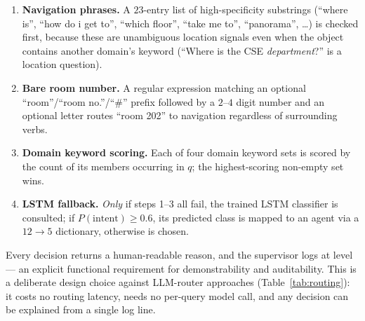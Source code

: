 \begin{enumerate}
\item \textbf{Navigation phrases.} A $23$-entry list of high-specificity
substrings (``where is'', ``how do i get to'', ``which floor'', ``take me
to'', ``panorama'', \dots) is checked first, because these are unambiguous
location signals even when the object contains another domain's keyword
(``Where is the CSE \emph{department}?'' is a location question).
\item \textbf{Bare room number.} A regular expression matching an optional
``room''/``room no.''/``\#'' prefix followed by a $2$--$4$ digit number and
an optional letter routes ``room 202'' to navigation regardless of
surrounding verbs.
\item \textbf{Domain keyword scoring.} Each of four domain keyword sets is
scored by the count of its members occurring in $q$; the highest-scoring
non-empty set wins.
\item \textbf{LSTM fallback.} \emph{Only} if steps 1--3 all fail, the
trained LSTM classifier is consulted; if $P(\text{intent}) \ge 0.6$, its
predicted class is mapped to an agent via a $12\!\to\!5$ dictionary,
otherwise  is chosen.
\end{enumerate}
Every decision returns a human-readable reason, and the supervisor logs
 at 
level --- an explicit functional requirement for demonstrability and
auditability. This is a deliberate design choice against LLM-router
approaches (Table~\ref{tab:routing}): it costs no routing latency, needs no
per-query model call, and any decision can be explained from a single log
line.

